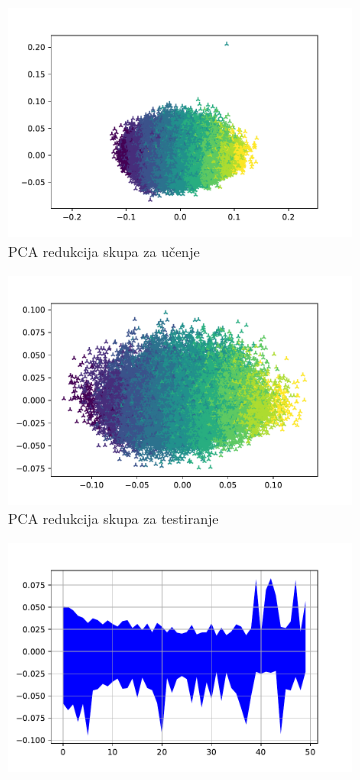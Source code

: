 \documentclass[times, utf8, numeric, diplomski]{fer}
\begin{document}
\begin{figure}[H]
\begin{subfigure}{.5\textwidth}
\includegraphics[width=\textwidth]{nl9_tr_instances.pdf}
\centering
\caption{PCA redukcija skupa za učenje}
\label{fig:dpa4_train_pca}
\end{subfigure}
\begin{subfigure}{.5\textwidth}
\includegraphics[width=\textwidth]{nl9_ts_instances.pdf}
\centering
\caption{PCA redukcija skupa za testiranje}
\label{fig:dpa4_test_pca}
\end{subfigure}
\begin{subfigure}{.5\textwidth}
\includegraphics[width=\textwidth]{nl9_tr_inputs.pdf}

\end{subfigure}
\end{figure}
\end{document}
